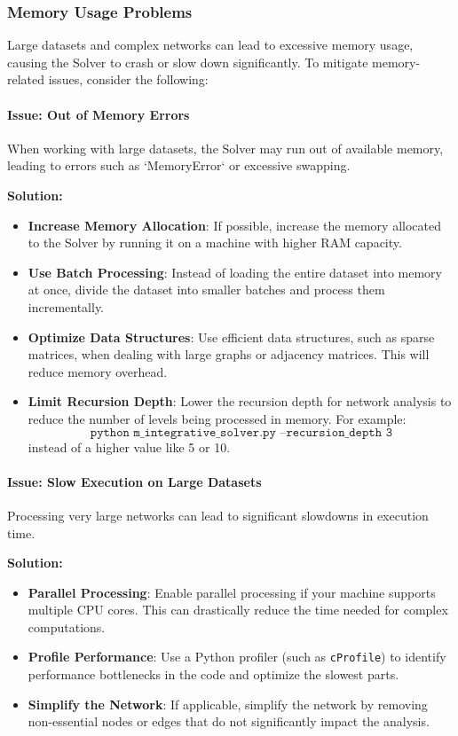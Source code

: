 \documentclass[%
 preprint, linenumbers,
 amsmath,amssymb,
 aps, physrev,
]{revtex4-2}
\begin{document}
\subsubsection{Memory Usage Problems}

Large datasets and complex networks can lead to excessive memory usage, causing the Solver to crash or slow down significantly. To mitigate memory-related issues, consider the following:

\paragraph{Issue: Out of Memory Errors}
When working with large datasets, the Solver may run out of available memory, leading to errors such as `MemoryError` or excessive swapping.

\textbf{Solution:}
\begin{itemize}
    \item \textbf{Increase Memory Allocation}: If possible, increase the memory allocated to the Solver by running it on a machine with higher RAM capacity.
    \item \textbf{Use Batch Processing}: Instead of loading the entire dataset into memory at once, divide the dataset into smaller batches and process them incrementally.
    \item \textbf{Optimize Data Structures}: Use efficient data structures, such as sparse matrices, when dealing with large graphs or adjacency matrices. This will reduce memory overhead.
    \item \textbf{Limit Recursion Depth}: Lower the recursion depth for network analysis to reduce the number of levels being processed in memory. For example:
    \[
    \texttt{python m\_integrative\_solver.py --recursion\_depth 3}
    \]
    instead of a higher value like 5 or 10.
\end{itemize}

\paragraph{Issue: Slow Execution on Large Datasets}
Processing very large networks can lead to significant slowdowns in execution time.

\textbf{Solution:}
\begin{itemize}
    \item \textbf{Parallel Processing}: Enable parallel processing if your machine supports multiple CPU cores. This can drastically reduce the time needed for complex computations.
    \item \textbf{Profile Performance}: Use a Python profiler (such as \texttt{cProfile}) to identify performance bottlenecks in the code and optimize the slowest parts.
    \item \textbf{Simplify the Network}: If applicable, simplify the network by removing non-essential nodes or edges that do not significantly impact the analysis.
\end{itemize}
\end{document}
